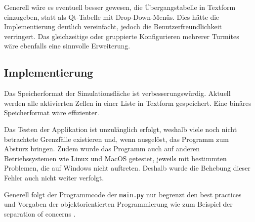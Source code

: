 Generell wäre es eventuell besser gewesen, die Übergangstabelle in Textform einzugeben, statt als Qt-Tabelle mit Drop-Down-Menüs. Dies hätte die Implementierung deutlich vereinfacht, jedoch die Benutzerfreundlichkeit verringert. Das gleichzeitige oder gruppierte Konfigurieren mehrerer Turmites wäre ebenfalls eine sinnvolle Erweiterung.

\subsection{Implementierung}
Das Speicherformat der Simulationsfläche ist verbesserungswürdig. Aktuell werden alle aktivierten Zellen in einer Liste in Textform gespeichert. Eine binäres Speicherformat wäre effizienter.  

Das Testen der Applikation ist unzulänglich erfolgt, weshalb viele noch nicht betrachtete Grenzfälle existieren und, wenn ausgelöst, das Programm zum Absturz bringen. Zudem wurde das Programm auch auf anderen Betriebssystemen wie Linux und MacOS getestet, jeweils mit bestimmten Problemen, die auf Windows nicht auftreten. Deshalb wurde die Behebung dieser Fehler auch nicht weiter verfolgt.

Generell folgt der Programmcode der \texttt{main.py} nur begrenzt den best practices und Vorgaben der objektorientierten Programmierung wie zum Beispiel der separation of concerns \cite{separationofconcerns}. 